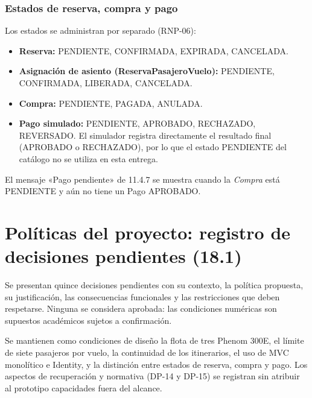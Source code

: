 \documentclass[11pt,a4paper]{article}
\begin{document}
\subsubsection*{Estados de reserva, compra y pago}
Los estados se administran por separado (RNP-06):
\begin{itemize}[leftmargin=1.2em,itemsep=1pt]
\item \textbf{Reserva:} PENDIENTE, CONFIRMADA, EXPIRADA, CANCELADA.
\item \textbf{Asignación de asiento (ReservaPasajeroVuelo):} PENDIENTE, CONFIRMADA, LIBERADA, CANCELADA.
\item \textbf{Compra:} PENDIENTE, PAGADA, ANULADA.
\item \textbf{Pago simulado:} PENDIENTE, APROBADO, RECHAZADO, REVERSADO. El simulador registra directamente el resultado final (APROBADO o RECHAZADO), por lo que el estado PENDIENTE del catálogo no se utiliza en esta entrega.
\end{itemize}
El mensaje «Pago pendiente» de 11.4.7 se muestra cuando la \emph{Compra} está PENDIENTE y aún no tiene un Pago APROBADO.

\clearpage
\section{Políticas del proyecto: registro de decisiones pendientes (18.1)}
Se presentan quince decisiones pendientes con su contexto, la política propuesta, su justificación, las consecuencias funcionales y las restricciones que deben respetarse. Ninguna se considera aprobada: las condiciones numéricas son supuestos académicos sujetos a confirmación.

Se mantienen como condiciones de diseño la flota de tres Phenom 300E, el límite de siete pasajeros por vuelo, la continuidad de los itinerarios, el uso de MVC monolítico e Identity, y la distinción entre estados de reserva, compra y pago. Los aspectos de recuperación y normativa (DP-14 y DP-15) se registran sin atribuir al prototipo capacidades fuera del alcance.
\end{document}
